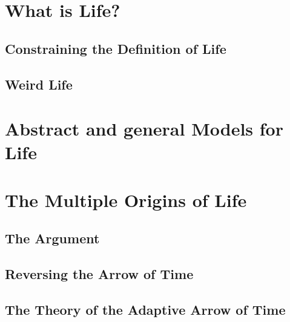 \documentclass[]{article}
\begin{document}
\cite{sagan1993search}
\cite{kaltenegger2017characterize}
\cite{fujii2018exoplanet}
\cite{nasa2019Explonet}
\cite{robinson2011earth}
\cite{marois2010images}
\cite{greenbaum2018gpi}
\cite{deming2013infrared}
\cite{knutson2007map}

\section{What is Life?}

\subsection{Constraining the Definition of Life}

\cite{schrodinger1944life}

\subsection{Weird Life}

\cite{hollants2011life}

\cite{kim2001life}

\cite[Chapter 6: Why Water? Toward More Exotic Habitats ]{board2007limits}

\cite{cejkova2014dynamics}

\section{Abstract and general Models for Life}

\cite{trifonov2011vocabulary}

\cite{cronin2016beyond}

\section{The Multiple Origins of Life}

\subsection{The Argument}

\subsection{Reversing the Arrow of Time}

\subsection{The Theory of the Adaptive Arrow of Time}
\end{document}
